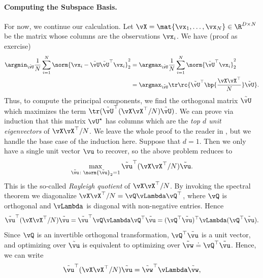 \documentclass[../../book-main.tex]{subfiles}
\begin{document}
\paragraph{Computing the Subspace Basis.}
For now, we continue our calculation. Let \(\vX = \mat{\vx_{1},
\dots, \vx_{N}} \in \R^{D \times N}\) be the matrix whose columns are
the observations \(\vx_{i}\). We have (proof as exercise)
\begin{align}
    \argmin_{\tilde{\vU}}\frac{1}{N}\sum_{i = 1}^{N}\norm{\vx_{i} -
    \tilde{\vU}\tilde{\vU}^{\top}\vx_{i}}_{2}^{2}
    &= \argmax_{\tilde{\vU}}\frac{1}{N}\sum_{i =
    1}^{N}\norm{\tilde{\vU}^{\top}\vx_{i}}_{2}^{2} \\
    &=
    \argmax_{\tilde{\vU}}\tr\rc{\tilde{\vU}^{\top}\bp{\frac{\vX\vX^{\top}}{N}}\tilde{\vU}}.
\end{align}
Thus, to compute the principal components, we find the orthogonal matrix
\(\tilde{\vU}\) which maximizes the term
\(\tr(\tilde{\vU}^{\top}(\vX\vX^{\top}/N)\tilde{\vU})\). We can prove via
induction that this matrix \(\vU^{\star}\) has columns which are the
\textit{top \(d\) unit eigenvectors} of \(\vX\vX^{\top}/N\). We leave
the whole proof to the reader in
, but we handle the
base case of the induction here. Suppose that \(d = 1\). Then we only
have a single unit vector \(\vu\) to recover, so the above problem reduces to
\begin{equation}
    \max_{\tilde{\vu} \colon \norm{\tilde{\vu}}_{2} = 1}
    \tilde{\vu}^{\top}(\vX\vX^{\top}/N)\tilde{\vu}.
\end{equation}
This is the so-called \textit{Rayleigh quotient} of
\(\vX\vX^{\top}/N\). By invoking the spectral theorem we diagonalize
\(\vX\vX^{\top}/N = \vQ\vLambda\vQ^{\top}\), where \(\vQ\) is
orthogonal and \(\vLambda\) is diagonal with non-negative entries. Hence
\begin{equation}
    \tilde{\vu}^{\top}(\vX\vX^{\top}/N)\tilde{\vu} =
    \tilde{\vu}^{\top}\vQ\vLambda\vQ^{\top}\tilde{\vu} =
    (\vQ^{\top}\tilde{\vu})^{\top}\vLambda(\vQ^{\top}\tilde{\vu}).
\end{equation}
Since \(\vQ\) is an invertible orthogonal transformation,
\(\vQ^{\top}\tilde{\vu}\) is a unit vector, and optimizing over
\(\tilde{\vu}\) is equivalent to optimizing over \(\tilde{\vw} \doteq
\vQ^{\top}\tilde{\vu}\). Hence, we can write
\begin{equation}
    \tilde{\vu}^{\top}(\vX\vX^{\top}/N)\tilde{\vu} =
    \tilde{\vw}^{\top}\vLambda\tilde{\vw},
\end{equation}
\end{document}
